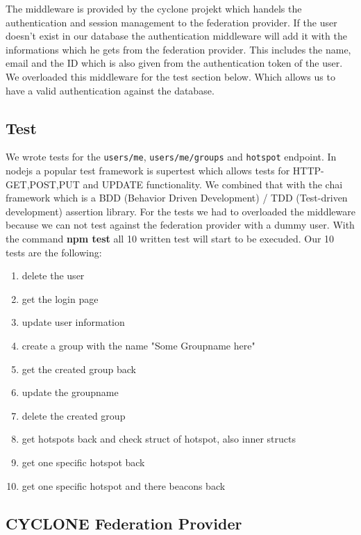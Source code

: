 The middleware is provided by the cyclone projekt which handels the authentication and session management to the federation provider. If the user doesn't exist in our database the authentication middleware will add it with the informations which he gets from the federation provider. This includes the name, email and the ID which is also given from the authentication token of the user. We overloaded this middleware for the test section below. Which allows us to have a valid authentication against the database.

\subsection{Test}

We wrote tests for the \texttt{users/me}, \texttt{users/me/groups} and \texttt{hotspot} endpoint. In nodejs a popular test framework is supertest which allows tests for HTTP-GET,POST,PUT and UPDATE functionality. We combined that with the chai framework which is a BDD (Behavior Driven Development) / TDD (Test-driven development) assertion library. For the tests we had to overloaded the middleware because we can not test against the federation provider with a dummy user. With the command \textbf{npm test} all 10 written test will start to be execuded. Our 10 tests are the following:

\begin{enumerate}
  \item delete the user
  \item get the login page
  \item update user information
  \item create a group with the name "Some Groupname here"
  \item get the created group back
  \item update the groupname
  \item delete the created group
  \item get hotspots back and check struct of hotspot, also inner structs
  \item get one specific hotspot back
  \item get one specific hotspot and there beacons back
\end{enumerate}

\subsection{CYCLONE Federation Provider}
\label{federation-provider}

